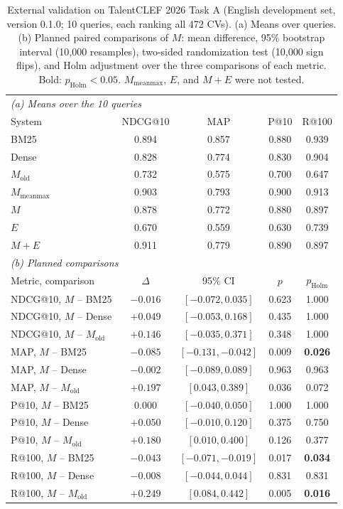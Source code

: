 \documentclass[CHICAGO]{USG}
\begin{document}
\begin{table}[!t]
\caption{External validation on TalentCLEF 2026 Task A (English development set, version 0.1.0; 10 queries, each ranking all 472 CVs). (a) Means over queries. (b) Planned paired comparisons of $M$: mean difference, 95\% bootstrap interval (10{,}000 resamples), two-sided randomization test (10{,}000 sign flips), and Holm adjustment over the three comparisons of each metric. Bold: $p_{\mathrm{Holm}}<0.05$. $M_{\mathrm{meanmax}}$, $E$, and $M{+}E$ were not tested.}
\label{tab:talentclef}
\centering
\footnotesize
\setlength{\tabcolsep}{4pt}
\begin{tabular}{lcccc}
\toprule
\multicolumn{5}{l}{\emph{(a) Means over the 10 queries}} \\
System & NDCG@10 & MAP & P@10 & R@100 \\
\midrule
BM25 & 0.894 & 0.857 & 0.880 & 0.939 \\
Dense & 0.828 & 0.774 & 0.830 & 0.904 \\
$M_{\mathrm{old}}$ & 0.732 & 0.575 & 0.700 & 0.647 \\
$M_{\mathrm{meanmax}}$ & 0.903 & 0.793 & 0.900 & 0.913 \\
$M$ & 0.878 & 0.772 & 0.880 & 0.897 \\
$E$ & 0.670 & 0.559 & 0.630 & 0.739 \\
$M{+}E$ & 0.911 & 0.779 & 0.890 & 0.897 \\
\midrule
\multicolumn{5}{l}{\emph{(b) Planned comparisons}} \\
Metric, comparison & $\Delta$ & 95\% CI & $p$ & $p_{\mathrm{Holm}}$ \\
\midrule
NDCG@10, $M$ -- BM25 & $-0.016$ & $[-0.072, 0.035]$ & 0.623 & 1.000 \\
NDCG@10, $M$ -- Dense & $+0.049$ & $[-0.053, 0.168]$ & 0.435 & 1.000 \\
NDCG@10, $M$ -- $M_{\mathrm{old}}$ & $+0.146$ & $[-0.035, 0.371]$ & 0.348 & 1.000 \\
MAP, $M$ -- BM25 & $-0.085$ & $[-0.131, -0.042]$ & 0.009 & \textbf{0.026} \\
MAP, $M$ -- Dense & $-0.002$ & $[-0.089, 0.089]$ & 0.963 & 0.963 \\
MAP, $M$ -- $M_{\mathrm{old}}$ & $+0.197$ & $[0.043, 0.389]$ & 0.036 & 0.072 \\
P@10, $M$ -- BM25 & $0.000$ & $[-0.040, 0.050]$ & 1.000 & 1.000 \\
P@10, $M$ -- Dense & $+0.050$ & $[-0.010, 0.120]$ & 0.375 & 0.750 \\
P@10, $M$ -- $M_{\mathrm{old}}$ & $+0.180$ & $[0.010, 0.400]$ & 0.126 & 0.377 \\
R@100, $M$ -- BM25 & $-0.043$ & $[-0.071, -0.019]$ & 0.017 & \textbf{0.034} \\
R@100, $M$ -- Dense & $-0.008$ & $[-0.044, 0.044]$ & 0.831 & 0.831 \\
R@100, $M$ -- $M_{\mathrm{old}}$ & $+0.249$ & $[0.084, 0.442]$ & 0.005 & \textbf{0.016} \\
\bottomrule
\end{tabular}
\end{table}
\end{document}
